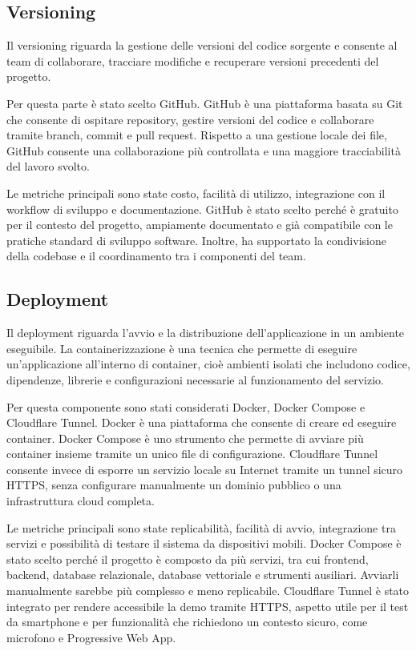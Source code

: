 \subsection*{Versioning}

Il versioning riguarda la gestione delle versioni del codice sorgente e consente al team di collaborare, tracciare modifiche e recuperare versioni precedenti del progetto.

Per questa parte è stato scelto GitHub. GitHub è una piattaforma basata su Git che consente di ospitare repository, gestire versioni del codice e collaborare tramite branch, commit e pull request. Rispetto a una gestione locale dei file, GitHub consente una collaborazione più controllata e una maggiore tracciabilità del lavoro svolto.

Le metriche principali sono state costo, facilità di utilizzo, integrazione con il workflow di sviluppo e documentazione. GitHub è stato scelto perché è gratuito per il contesto del progetto, ampiamente documentato e già compatibile con le pratiche standard di sviluppo software. Inoltre, ha supportato la condivisione della codebase e il coordinamento tra i componenti del team.

\subsection*{Deployment}

Il deployment riguarda l’avvio e la distribuzione dell’applicazione in un ambiente eseguibile. La containerizzazione è una tecnica che permette di eseguire un’applicazione all’interno di container, cioè ambienti isolati che includono codice, dipendenze, librerie e configurazioni necessarie al funzionamento del servizio.

Per questa componente sono stati considerati Docker, Docker Compose e Cloudflare Tunnel. Docker è una piattaforma che consente di creare ed eseguire container. Docker Compose è uno strumento che permette di avviare più container insieme tramite un unico file di configurazione. Cloudflare Tunnel consente invece di esporre un servizio locale su Internet tramite un tunnel sicuro HTTPS, senza configurare manualmente un dominio pubblico o una infrastruttura cloud completa.

Le metriche principali sono state replicabilità, facilità di avvio, integrazione tra servizi e possibilità di testare il sistema da dispositivi mobili. Docker Compose è stato scelto perché il progetto è composto da più servizi, tra cui frontend, backend, database relazionale, database vettoriale e strumenti ausiliari. Avviarli manualmente sarebbe più complesso e meno replicabile. Cloudflare Tunnel è stato integrato per rendere accessibile la demo tramite HTTPS, aspetto utile per il test da smartphone e per funzionalità che richiedono un contesto sicuro, come microfono e Progressive Web App.

